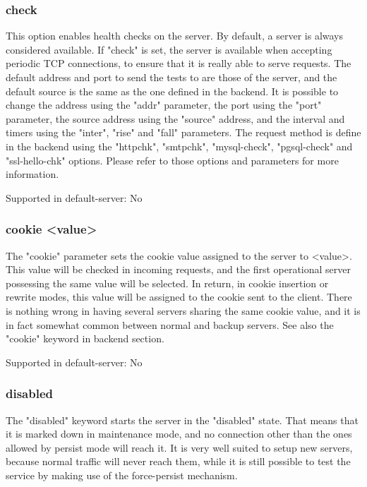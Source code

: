 \subsubsection[check]{check}
  This option enables health checks on the server. By default, a server is
  always considered available. If "check" is set, the server is available when
  accepting periodic TCP connections, to ensure that it is really able to serve
  requests. The default address and port to send the tests to are those of the
  server, and the default source is the same as the one defined in the
  backend. It is possible to change the address using the "addr" parameter, the
  port using the "port" parameter, the source address using the "source"
  address, and the interval and timers using the "inter", "rise" and "fall"
  parameters. The request method is define in the backend using the "httpchk",
  "smtpchk", "mysql-check", "pgsql-check" and "ssl-hello-chk" options. Please
  refer to those options and parameters for more information.

  Supported in default-server: No

\subsubsection[cookie]{cookie <value>}
  The "cookie" parameter sets the cookie value assigned to the server to
  <value>. This value will be checked in incoming requests, and the first
  operational server possessing the same value will be selected. In return, in
  cookie insertion or rewrite modes, this value will be assigned to the cookie
  sent to the client. There is nothing wrong in having several servers sharing
  the same cookie value, and it is in fact somewhat common between normal and
  backup servers. See also the "cookie" keyword in backend section.

  Supported in default-server: No

\subsubsection[disabled]{disabled}
  The "disabled" keyword starts the server in the "disabled" state. That means
  that it is marked down in maintenance mode, and no connection other than the
  ones allowed by persist mode will reach it. It is very well suited to setup
  new servers, because normal traffic will never reach them, while it is still
  possible to test the service by making use of the force-persist mechanism.

